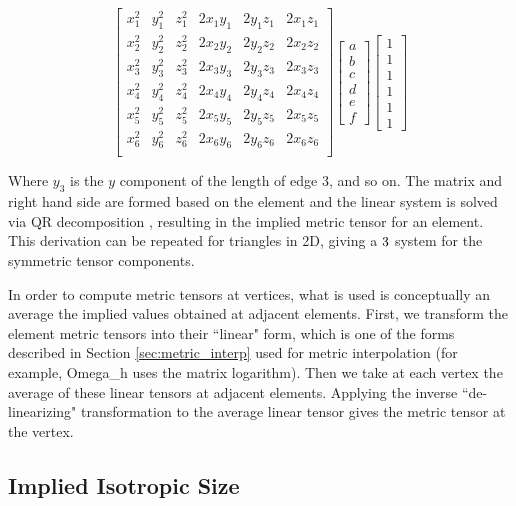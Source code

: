\begin{equation}
\begin{bmatrix}
x_1^2 & y_1^2 & z_1^2 & 2x_1y_1 & 2y_1z_1 & 2x_1z_1 \\
x_2^2 & y_2^2 & z_2^2 & 2x_2y_2 & 2y_2z_2 & 2x_2z_2 \\
x_3^2 & y_3^2 & z_3^2 & 2x_3y_3 & 2y_3z_3 & 2x_3z_3 \\
x_4^2 & y_4^2 & z_4^2 & 2x_4y_4 & 2y_4z_4 & 2x_4z_4 \\
x_5^2 & y_5^2 & z_5^2 & 2x_5y_5 & 2y_5z_5 & 2x_5z_5 \\
x_6^2 & y_6^2 & z_6^2 & 2x_6y_6 & 2y_6z_6 & 2x_6z_6 \\
\end{bmatrix}
\begin{bmatrix}
a \\ b \\ c \\ d \\ e \\ f
\end{bmatrix}
\begin{bmatrix}
1 \\ 1 \\ 1 \\ 1 \\ 1 \\ 1
\end{bmatrix}
\end{equation}

Where $y_3$ is the $y$ component of the length of edge 3,
and so on.
The matrix and right hand side are formed based on the element
and the linear system is solved via QR decomposition
\cite{trefethen1997numerical}, resulting in
the implied metric tensor for an element.
This derivation can be repeated for triangles in 2D, giving
a $3\time 3$ system for the symmetric tensor components.

In order to compute metric tensors at vertices,
what is used is conceptually an average the implied values obtained
at adjacent elements.
First, we transform the element metric tensors into their
``linear" form, which is one of the forms described
in Section \ref{sec:metric_interp} used for metric interpolation
(for example, Omega\_h uses the matrix logarithm).
Then we take at each vertex the average of these linear
tensors at adjacent elements.
Applying the inverse ``de-linearizing" transformation to the
average linear tensor gives the metric tensor at the vertex.

\subsection{Implied Isotropic Size}
\label{sec:ident_size}

